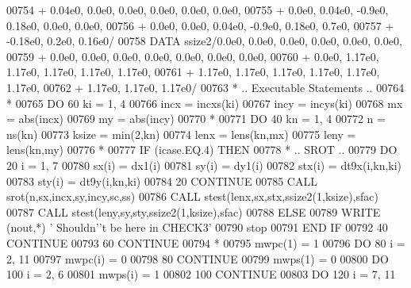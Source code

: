 \begin{DoxyCode}
00754      +                  0.04e0, 0.0e0, 0.0e0, 0.0e0, 0.0e0, 0.0e0,
00755      +                  0.0e0, 0.04e0, -0.9e0, 0.18e0, 0.0e0, 0.0e0,
00756      +                  0.0e0, 0.0e0, 0.04e0, -0.9e0, 0.18e0, 0.7e0,
00757      +                  -0.18e0, 0.2e0, 0.16e0/
00758       \textcolor{keyword}{DATA}              ssize2/0.0e0, 0.0e0, 0.0e0, 0.0e0, 0.0e0, 0.0e0,
00759      +                  0.0e0, 0.0e0, 0.0e0, 0.0e0, 0.0e0, 0.0e0, 0.0e0,
00760      +                  0.0e0, 1.17e0, 1.17e0, 1.17e0, 1.17e0, 1.17e0,
00761      +                  1.17e0, 1.17e0, 1.17e0, 1.17e0, 1.17e0, 1.17e0,
00762      +                  1.17e0, 1.17e0, 1.17e0/
00763 \textcolor{comment}{*     .. Executable Statements ..}
00764 \textcolor{comment}{*}
00765       \textcolor{keywordflow}{DO} 60 ki = 1, 4
00766          incx = incxs(ki)
00767          incy = incys(ki)
00768          mx = abs(incx)
00769          my = abs(incy)
00770 \textcolor{comment}{*}
00771          \textcolor{keywordflow}{DO} 40 kn = 1, 4
00772             n = ns(kn)
00773             ksize = min(2,kn)
00774             lenx = lens(kn,mx)
00775             leny = lens(kn,my)
00776 \textcolor{comment}{*}
00777             \textcolor{keywordflow}{IF} (icase.EQ.4) \textcolor{keywordflow}{THEN}
00778 \textcolor{comment}{*              .. SROT ..}
00779                \textcolor{keywordflow}{DO} 20 i = 1, 7
00780                   sx(i) = dx1(i)
00781                   sy(i) = dy1(i)
00782                   stx(i) = dt9x(i,kn,ki)
00783                   sty(i) = dt9y(i,kn,ki)
00784    20          \textcolor{keywordflow}{CONTINUE}
00785                \textcolor{keyword}{CALL }srot(n,sx,incx,sy,incy,sc,ss)
00786                \textcolor{keyword}{CALL }stest(lenx,sx,stx,ssize2(1,ksize),sfac)
00787                \textcolor{keyword}{CALL }stest(leny,sy,sty,ssize2(1,ksize),sfac)
00788             \textcolor{keywordflow}{ELSE}
00789                \textcolor{keyword}{WRITE} (nout,*) \textcolor{stringliteral}{' Shouldn'}\textcolor{stringliteral}{'t be here in CHECK3'}
00790                stop
00791 \textcolor{keywordflow}{            END IF}
00792    40    \textcolor{keywordflow}{CONTINUE}
00793    60 \textcolor{keywordflow}{CONTINUE}
00794 \textcolor{comment}{*}
00795       mwpc(1) = 1
00796       \textcolor{keywordflow}{DO} 80 i = 2, 11
00797          mwpc(i) = 0
00798    80 \textcolor{keywordflow}{CONTINUE}
00799       mwps(1) = 0
00800       \textcolor{keywordflow}{DO} 100 i = 2, 6
00801          mwps(i) = 1
00802   100 \textcolor{keywordflow}{CONTINUE}
00803       \textcolor{keywordflow}{DO} 120 i = 7, 11

\end{DoxyCode}
